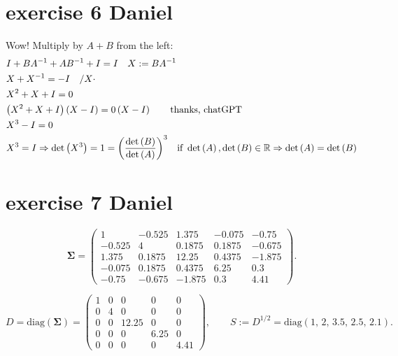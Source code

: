 \documentclass{article}
\let\normalSigma\Sigma
\renewcommand{\Sigma}{\bm{\normalSigma}} %
\begin{document}
\section{exercise 6 Daniel}
Wow! Multiply by $A+B$ from the left:
\[\begin{gathered}
        I + B{A^{ - 1}} + A{B^{ - 1}} + I = I\quad X: = B{A^{ - 1}} \hfill \\
        X + {X^{ - 1}} =  - I\quad /X \cdot  \hfill \\
        {X^2} + X + I = 0 \hfill \\
        \left( {{X^2} + X + I} \right)\left( {X - I} \right) = 0\left( {X - I} \right) \qquad \text{thanks, chatGPT}\hfill \\
        {X^3} - I = 0 \hfill \\
        {X^3} = I \Rightarrow \det \left( {{X^3}} \right) = 1 = {\left( {\frac{{\det \left( B \right)}}{{\det \left( A \right)}}} \right)^3}\quad {\text{if }}\det \left( A \right),\det \left( B \right) \in \mathbb{R} \Rightarrow \det \left( A \right) = \det \left( B \right) \hfill \\
    \end{gathered} \]

\section{exercise 7 Daniel}
\[
    \Sigma =
    \begin{pmatrix}
        1      & -0.525 & 1.375  & -0.075 & -0.75  \\
        -0.525 & 4      & 0.1875 & 0.1875 & -0.675 \\
        1.375  & 0.1875 & 12.25  & 0.4375 & -1.875 \\
        -0.075 & 0.1875 & 0.4375 & 6.25   & 0.3    \\
        -0.75  & -0.675 & -1.875 & 0.3    & 4.41
    \end{pmatrix}.
\]

\[
    D=\mathrm{diag}(\Sigma)=
    \begin{pmatrix}
        1 & 0 & 0     & 0    & 0    \\
        0 & 4 & 0     & 0    & 0    \\
        0 & 0 & 12.25 & 0    & 0    \\
        0 & 0 & 0     & 6.25 & 0    \\
        0 & 0 & 0     & 0    & 4.41
    \end{pmatrix},
    \qquad
    S:=D^{1/2}=\mathrm{diag}(1,\,2,\,3.5,\,2.5,\,2.1).
\]
\end{document}

